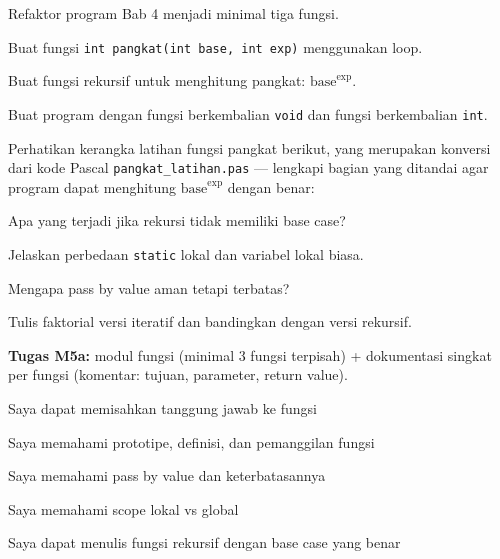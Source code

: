 \documentclass[../main.tex]{subfiles}
\begin{document}
\begin{aktivitas}
  \item Refaktor program Bab 4 menjadi minimal tiga fungsi.
  \item Buat fungsi \texttt{int pangkat(int base, int exp)} menggunakan loop.
  \item Buat fungsi rekursif untuk menghitung pangkat: $\mathrm{base}^{\mathrm{exp}}$.
  \item Buat program dengan fungsi berkembalian \texttt{void} dan fungsi berkembalian \texttt{int}.
  \item Perhatikan kerangka latihan fungsi pangkat berikut, yang merupakan konversi dari kode Pascal \texttt{pangkat\_latihan.pas} --- lengkapi bagian yang ditandai agar program dapat menghitung $\mathrm{base}^{\mathrm{exp}}$ dengan benar:
\end{aktivitas}



\begin{latihan}
  \item Apa yang terjadi jika rekursi tidak memiliki base case?
  \item Jelaskan perbedaan \texttt{static} lokal dan variabel lokal biasa.
  \item Mengapa pass by value aman tetapi terbatas?
  \item Tulis faktorial versi iteratif dan bandingkan dengan versi rekursif.
\end{latihan}

\begin{asesmen}
\textbf{Tugas M5a:} modul fungsi (minimal 3 fungsi terpisah) + dokumentasi singkat per fungsi (komentar: tujuan, parameter, return value).
\end{asesmen}

\begin{checklist}
  \item Saya dapat memisahkan tanggung jawab ke fungsi
  \item Saya memahami prototipe, definisi, dan pemanggilan fungsi
  \item Saya memahami pass by value dan keterbatasannya
  \item Saya memahami scope lokal vs global
  \item Saya dapat menulis fungsi rekursif dengan base case yang benar
\end{checklist}
\end{document}
